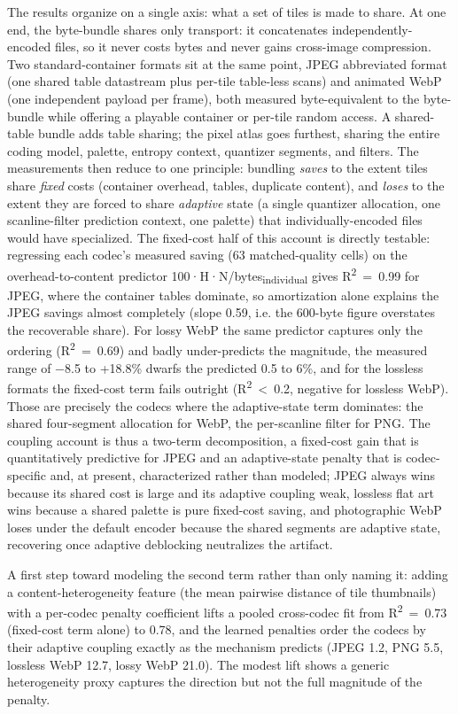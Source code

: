\documentclass[3p,twocolumn]{elsarticle}
\begin{document}
The results organize on a single axis: what a set of tiles is made to
share. At one end, the byte-bundle shares only transport: it
concatenates independently-encoded files, so it never costs bytes and
never gains cross-image compression. Two standard-container formats sit
at the same point, JPEG abbreviated format (one shared table datastream
plus per-tile table-less scans) and animated WebP (one independent
payload per frame), both measured byte-equivalent to the byte-bundle
while offering a playable container or per-tile random access. A
shared-table bundle adds table sharing; the pixel atlas goes furthest,
sharing the entire coding model, palette, entropy context, quantizer
segments, and filters. The measurements then reduce to one principle:
bundling \emph{saves} to the extent tiles share \emph{fixed} costs
(container overhead, tables, duplicate content), and \emph{loses} to the
extent they are forced to share \emph{adaptive} state (a single
quantizer allocation, one scanline-filter prediction context, one
palette) that individually-encoded files would have specialized. The
fixed-cost half of this account is directly testable: regressing each
codec's measured saving (63 matched-quality cells) on
the overhead-to-content predictor
100·H·N/bytes\textsubscript{individual} gives
R\textsuperscript{2}~=~0.99 for JPEG, where the container tables
dominate, so amortization alone explains the JPEG savings almost
completely (slope 0.59, i.e. the 600-byte figure overstates the
recoverable share). For lossy WebP the same predictor captures only the
ordering (R\textsuperscript{2}~=~0.69) and badly under-predicts the
magnitude, the measured range of −8.5 to +18.8\% dwarfs the predicted
0.5 to 6\%, and for the lossless formats the fixed-cost term fails
outright (R\textsuperscript{2}~\textless~0.2, negative for lossless
WebP). Those are precisely the codecs where the adaptive-state term
dominates: the shared four-segment allocation for WebP, the per-scanline
filter for PNG. The coupling account is thus a two-term decomposition, a
fixed-cost gain that is quantitatively predictive for JPEG and an
adaptive-state penalty that is codec-specific and, at present,
characterized rather than modeled; JPEG always wins because its shared
cost is large and its adaptive coupling weak, lossless flat art wins
because a shared palette is pure fixed-cost saving, and photographic
WebP loses under the default encoder because the shared segments are
adaptive state, recovering once adaptive deblocking neutralizes the
artifact.

A first step toward modeling the second term rather than only naming it:
adding a content-heterogeneity feature (the mean pairwise distance of
tile thumbnails) with a per-codec penalty coefficient lifts a pooled
cross-codec fit from R\textsuperscript{2}~=~0.73 (fixed-cost term alone)
to 0.78, and the learned penalties order the codecs by their adaptive
coupling exactly as the mechanism predicts (JPEG 1.2, PNG 5.5, lossless
WebP 12.7, lossy WebP 21.0). The modest lift shows a generic
heterogeneity proxy captures the direction but not the full magnitude of
the penalty.
\end{document}
